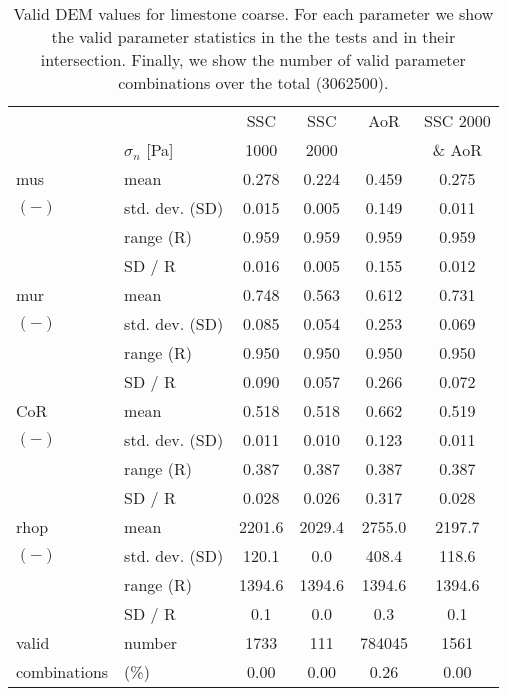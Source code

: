 \begin{table}[htbp] 
 \centering 
\begin{tabular}{ll|cccc} 
 \hline 
 &    & SSC & SSC & AoR   & SSC 2000 \\ 
 & $\sigma_n$  [Pa]  & 1000 & 2000 &    & \& AoR \\ 
 \hline 
\acs{mus} & mean & 0.278 & 0.224 & 0.459 & 0.275 \\ 
$(-)$ & std. dev. (SD) & 0.015 & 0.005 & 0.149 & 0.011 \\ 
 & range (\acs{R}) & 0.959 & 0.959 & 0.959 & 0.959 \\ 
 & SD / R & 0.016 & 0.005 & 0.155 & 0.012 \\ 
 \hline 
\acs{mur} & mean & 0.748 & 0.563 & 0.612 & 0.731 \\ 
$(-)$ & std. dev. (SD) & 0.085 & 0.054 & 0.253 & 0.069 \\ 
 & range (\acs{R}) & 0.950 & 0.950 & 0.950 & 0.950 \\ 
 & SD / R & 0.090 & 0.057 & 0.266 & 0.072 \\ 
 \hline 
\acs{CoR} & mean & 0.518 & 0.518 & 0.662 & 0.519 \\ 
$(-)$ & std. dev. (SD) & 0.011 & 0.010 & 0.123 & 0.011 \\ 
 & range (\acs{R}) & 0.387 & 0.387 & 0.387 & 0.387 \\ 
 & SD / R & 0.028 & 0.026 & 0.317 & 0.028 \\ 
 \hline 
\acs{rhop} & mean & 2201.6 & 2029.4 & 2755.0 & 2197.7 \\ 
$(-)$ & std. dev. (SD) & 120.1 &  0.0 & 408.4 & 118.6 \\ 
 & range (\acs{R}) & 1394.6 & 1394.6 & 1394.6 & 1394.6 \\ 
 & SD / R &  0.1 &  0.0 &  0.3 &  0.1 \\ 
 \hline 
valid & number & 1733 &  111 & 784045 & 1561 \\ 
combinations & (\%)  & 0.00 & 0.00 & 0.26 & 0.00 \\ 
 \hline 
\end{tabular} 
\caption[Valid DEM values for limestone coarse]{Valid DEM values for
limestone coarse.
For each parameter we show the valid parameter statistics in the the tests and in 
their intersection. Finally, we show the number of valid parameter combinations over the total (3062500).} 
\label{tab:29DEMvalidvalueslimestonecoarse} 
\end{table}